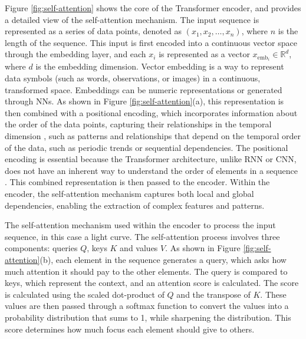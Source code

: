 Figure \ref{fig:self-attention} shows the core of the Transformer encoder, and provides a detailed view of the self-attention mechanism. The input sequence is represented as a series of data points, denoted as $(x_1, x_2, \ldots, x_n)$, where $n$ is the length of the sequence. This input is first encoded into a continuous vector space through the embedding layer, and each $x_i$ is represented as a vector $x_{\mathrm{emb}_i} \in \mathbb{R}^d$, where $d$ is the embedding dimension. Vector embedding is a way to represent data symbols (such as words, observations, or images) in a continuous, transformed space. Embeddings can be numeric representations or generated through NNs. As shown in Figure \ref{fig:self-attention}(a), this representation is then combined with a positional encoding, which incorporates information about the order of the data points, capturing their relationships in the temporal dimension \citep{vaswani2017attention}, such as patterns and relationships that depend on the temporal order of the data, such as periodic trends or sequential dependencies. The positional encoding is essential because the Transformer architecture, unlike RNN or CNN, does not have an inherent way to understand the order of elements in a sequence \citep{gehring2017convolutional}. This combined representation is then passed to the encoder. Within the encoder, the self-attention mechanism captures both local and global dependencies, enabling the extraction of complex features and patterns.  \par

The self-attention mechanism used within the encoder to process the input sequence, in this case a light curve. The self-attention process involves three components: queries ${Q}$, keys ${K}$ and values ${V}$. As shown in Figure \ref{fig:self-attention}(b), each element in the sequence generates a query, which asks how much attention it should pay to the other elements. The query is compared to keys, which represent the context, and an attention score is calculated. The score is calculated using the scaled dot-product of ${Q}$ and the transpose of ${K}$. These values are then passed through a softmax function to convert the values into a probability distribution that sums to 1, while sharpening the distribution. This score determines how much focus each element should give to others. \par

